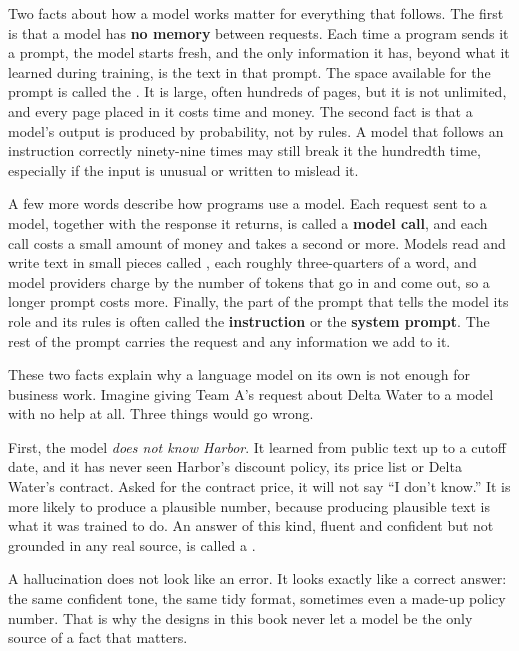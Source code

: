 Two facts about how a model works matter for everything that follows. The first is that a model has \textbf{no memory} between requests. Each time a program sends it a prompt, the model starts fresh, and the only information it has, beyond what it learned during training, is the text in that prompt. The space available for the prompt is called the . It is large, often hundreds of pages, but it is not unlimited, and every page placed in it costs time and money. The second fact is that a model's output is produced by probability, not by rules. A model that follows an instruction correctly ninety-nine times may still break it the hundredth time, especially if the input is unusual or written to mislead it.

A few more words describe how programs use a model. Each request sent to a model, together with the response it returns, is called a \textbf{model call}, and each call costs a small amount of money and takes a second or more. Models read and write text in small pieces called , each roughly three-quarters of a word, and model providers charge by the number of tokens that go in and come out, so a longer prompt costs more. Finally, the part of the prompt that tells the model its role and its rules is often called the \textbf{instruction} or the \textbf{system prompt}. The rest of the prompt carries the request and any information we add to it.


These two facts explain why a language model on its own is not enough for business work. Imagine giving Team A's request about Delta Water to a model with no help at all. Three things would go wrong.

First, the model \emph{does not know Harbor}. It learned from public text up to a cutoff date, and it has never seen Harbor's discount policy, its price list or Delta Water's contract. Asked for the contract price, it will not say ``I don't know.'' It is more likely to produce a plausible number, because producing plausible text is what it was trained to do. An answer of this kind, fluent and confident but not grounded in any real source, is called a .

\begin{watchout}
A hallucination does not look like an error. It looks exactly like a correct answer: the same confident tone, the same tidy format, sometimes even a made-up policy number. That is why the designs in this book never let a model be the only source of a fact that matters.
\end{watchout}

